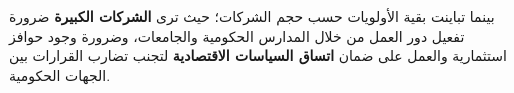 بينما تباينت بقية الأولويات حسب حجم الشركات؛ حيث ترى \textbf{الشركات الكبيرة} ضرورة تفعيل دور العمل من خلال المدارس الحكومية والجامعات، وضرورة وجود حوافز استثمارية والعمل على ضمان \textbf{اتساق السياسات الاقتصادية} لتجنب تضارب القرارات بين الجهات الحكومية.
